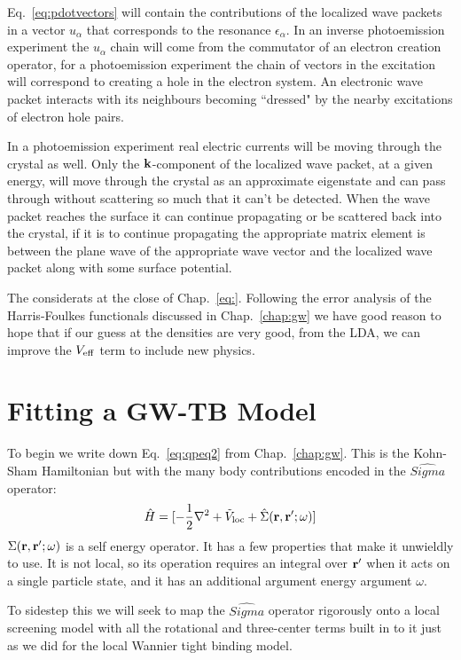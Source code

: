 Eq.~\ref{eq:pdotvectors} will contain the contributions of the localized
wave packets in a vector $u_{\alpha}$ that corresponds to the resonance 
$\epsilon_{\alpha}$. In an inverse photoemission experiment the $u_{\alpha}$ chain
will come from the commutator of an electron creation operator, for a photoemission
experiment the chain of vectors in the excitation will correspond to creating a hole
in the electron system. An electronic wave packet interacts with its neighbours becoming
``dressed" by the nearby excitations of electron hole pairs. 

In a photoemission experiment real electric currents will be moving through 
the crystal as well. Only the ${\bf k}$-component of the localized wave packet, 
at a given energy, will move through the crystal as 
an approximate eigenstate and can pass through without scattering 
so much that it can't be detected.
When the wave packet reaches the surface it can continue propagating
or be scattered back into the crystal, if it is to continue 
propagating the appropriate matrix element
is between the plane wave of the appropriate wave vector and 
the localized wave packet along with some surface potential.

The considerats at the close of Chap.~\ref{eq:}. Following the error 
analysis of the Harris-Foulkes functionals discussed in Chap.~\ref{chap:gw} 
we have good reason to hope that if our guess at the densities are very good, 
from the LDA, we can improve the $V_{\rm eff}$ term to include new physics.

\section{Fitting a GW-TB Model}
To begin we write down Eq.~\ref{eq:qpeq2} from Chap.~\ref{chap:gw}.
This is the Kohn-Sham Hamiltonian but with the many body contributions
encoded in the $\hat{Sigma}$ operator:
%
\begin{equation}
\hat{H} = [-\frac{1}{2}\nabla^{2} + \tilde{V}_{\rm loc} + \hat{\Sigma}({\bf r},{\bf r}';\omega)]
\end{equation}
%
$\Sigma({\bf r},{\bf r}';\omega)$ is a self energy operator. It has a few properties
that make it unwieldly to use. It is not local, so its operation requires an integral over
${\bf r}'$ when it acts on a single particle state, and it has an additional argument 
energy argument $\omega$. 

To sidestep this we will seek to map the $\hat{Sigma}$ operator 
rigorously onto a local screening model with all the rotational and
three-center terms built in to it just as we did for the local Wannier 
tight binding model.

